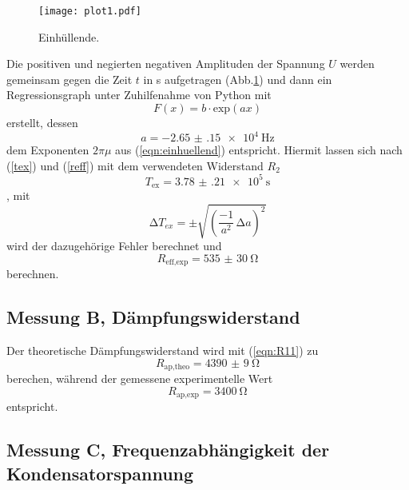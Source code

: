 \begin{figure}
  \centering
  \texttt{[image: plot1.pdf]}
  \caption{Einhüllende.}
  \label{fig:plot1}
\end{figure}
 Die positiven und negierten negativen Amplituden der Spannung $U$ werden gemeinsam
gegen die Zeit $t$ in s aufgetragen (Abb.\ref{fig:plot1}) und dann ein Regressionsgraph
unter Zuhilfenahme von Python mit
\begin{equation}
   F(x) = b\cdot\text{exp}(ax)
\end{equation}
erstellt, dessen
\begin{equation*}
   a = \SI{-2.65(15)e4}{\hertz}
\end{equation*}
dem Exponenten $2\pi\mu$ aus (\ref{eqn:einhuellend}) entspricht.
Hiermit lassen sich nach (\ref{tex}) und (\ref{reff}) mit dem verwendeten Widerstand $R_{\text{2}}$
\begin{equation*}
   T_{\text{ex}} = \SI{3.78(21)e5}{\second}
\end{equation*}
, mit
\begin{equation}
  \increment T_{ex} = \pm \sqrt{\left(\frac{-1}{a^2}\, \increment a \right)^2}
\end{equation}
wird der dazugehörige Fehler berechnet und
\begin{equation*}
R_{\text{eff,exp}} = \SI{535(30)}{\ohm}
\end{equation*}
berechnen.




\subsection{Messung B, Dämpfungswiderstand}
Der theoretische Dämpfungswiderstand wird mit (\ref{eqn:R11}) zu
\begin{equation*}
  R_{\text{ap,theo}} = \SI{4390(9)}{\ohm}
\end{equation*}
  berechen, während der gemessene experimentelle Wert
\begin{equation*}
  R_{\text{ap,exp}} = \SI{3400}{\ohm}
\end{equation*}
entspricht.

\subsection{Messung C, Frequenzabhängigkeit der Kondensatorspannung}

